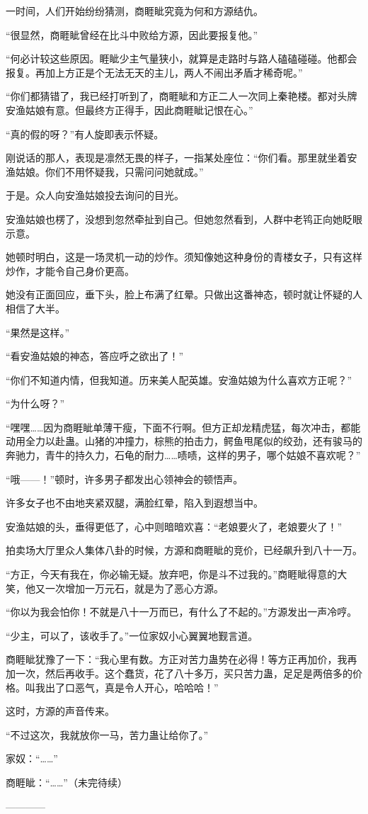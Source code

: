 \begin{this_body}
一时间，人们开始纷纷猜测，商睚眦究竟为何和方源结仇。

“很显然，商睚眦曾经在比斗中败给方源，因此要报复他。”

“何必计较这些原因。睚眦少主气量狭小，就算是走路时与路人磕磕碰碰。他都会报复。再加上方正是个无法无天的主儿，两人不闹出矛盾才稀奇呢。”

“你们都猜错了，我已经打听到了，商睚眦和方正二人一次同上秦艳楼。都对头牌安渔姑娘有意。但最终方正得手，因此商睚眦记恨在心。”

“真的假的呀？”有人旋即表示怀疑。

刚说话的那人，表现是凛然无畏的样子，一指某处座位：“你们看。那里就坐着安渔姑娘。你们不用怀疑我，只需问问她就成。”

于是。众人向安渔姑娘投去询问的目光。

安渔姑娘也楞了，没想到忽然牵扯到自己。但她忽然看到，人群中老鸨正向她眨眼示意。

她顿时明白，这是一场灵机一动的炒作。须知像她这种身份的青楼女子，只有这样炒作，才能令自己身价更高。

她没有正面回应，垂下头，脸上布满了红晕。只做出这番神态，顿时就让怀疑的人相信了大半。

“果然是这样。”

“看安渔姑娘的神态，答应呼之欲出了！”

“你们不知道内情，但我知道。历来美人配英雄。安渔姑娘为什么喜欢方正呢？”

“为什么呀？”

“嘿嘿……因为商睚眦单薄干瘦，下面不行啊。但方正却龙精虎猛，每次冲击，都能动用全力以赴蛊。山猪的冲撞力，棕熊的拍击力，鳄鱼甩尾似的绞劲，还有骏马的奔驰力，青牛的持久力，石龟的耐力……啧啧，这样的男子，哪个姑娘不喜欢呢？”

“哦——！”顿时，许多男子都发出心领神会的顿悟声。

许多女子也不由地夹紧双腿，满脸红晕，陷入到遐想当中。

安渔姑娘的头，垂得更低了，心中则暗暗欢喜：“老娘要火了，老娘要火了！”

拍卖场大厅里众人集体八卦的时候，方源和商睚眦的竞价，已经飙升到八十一万。

“方正，今天有我在，你必输无疑。放弃吧，你是斗不过我的。”商睚眦得意的大笑，他又一次增加一万元石，就是为了恶心方源。

“你以为我会怕你！不就是八十一万而已，有什么了不起的。”方源发出一声冷哼。

“少主，可以了，该收手了。”一位家奴小心翼翼地觐言道。

商睚眦犹豫了一下：“我心里有数。方正对苦力蛊势在必得！等方正再加价，我再加一次，然后再收手。这个蠢货，花了八十多万，买只苦力蛊，足足是两倍多的价格。叫我出了口恶气，真是令人开心，哈哈哈！”

这时，方源的声音传来。

“不过这次，我就放你一马，苦力蛊让给你了。”

家奴：“……”

商睚眦：“……”（未完待续）

------------

\end{this_body}

